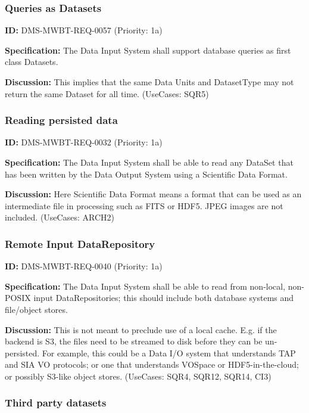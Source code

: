 \documentclass[SE,toc,lsstdraft]{lsstdoc}
\begin{document}
\subsubsection{Queries as Datasets}

\label{DMS-MWBT-REQ-0057}
\textbf{ID:} DMS-MWBT-REQ-0057 (Priority: 1a)

\textbf{Specification:}
The Data Input System shall support database queries as first class Datasets.

\textbf{Discussion:}
This implies that the same Data Units and DatasetType may not return the same Dataset for all time. (UseCases: SQR5)

\subsubsection{Reading persisted data}

\label{DMS-MWBT-REQ-0032}
\textbf{ID:} DMS-MWBT-REQ-0032 (Priority: 1a)

\textbf{Specification:}
The Data Input System shall be able to read any DataSet that has been written by the Data Output System using a Scientific Data Format.

\textbf{Discussion:}
Here Scientific Data Format means a format that can be used as an intermediate file in processing such as FITS or HDF5. JPEG images are not included. (UseCases: ARCH2)

\subsubsection{Remote Input DataRepository}

\label{DMS-MWBT-REQ-0040}
\textbf{ID:} DMS-MWBT-REQ-0040 (Priority: 1a)

\textbf{Specification:}
The Data Input System shall be able to read from non-local, non-POSIX input DataRepositories; this should include both database systems and file/object stores.

\textbf{Discussion:}
This is not meant to preclude use of a local cache. E.g. if the backend is S3, the files need to be streamed to disk before they can be un-persisted. For example, this could be a Data I/O system that understands TAP and SIA VO protocols; or one that understands VOSpace or HDF5-in-the-cloud; or possibly S3-like object stores. (UseCases: SQR4, SQR12, SQR14, CI3)

\subsubsection{Third party datasets}
\end{document}
